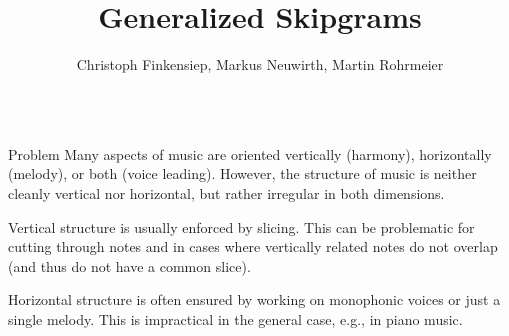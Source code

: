 \documentclass[final]{beamer}
\title{Generalized Skipgrams}
\author{Christoph Finkensiep, Markus Neuwirth, Martin Rohrmeier}
\institute{Digital and Cognitive Musicology Lab, École Polytechnique Fédérale de Lausanne}
\newcommand*{\pianoroll}{
  \draw (0,2) rectangle (1,2.4);
  \draw (1,2.4) rectangle (2,2.8);
  \draw (2,2) rectangle (2.5,2.4);
  \draw (2.5,1.6) rectangle (3,2);
  \draw (3,1.2) rectangle (3.5,1.6);
  \draw (3.5,0.8) rectangle (4,1.2);
  
  \draw (4,1.6) rectangle (5,2);
  \draw (5,2) rectangle (6,2.4);
  \draw (6,1.6) rectangle (6.5,2);
  \draw (6.5,1.2) rectangle (7,1.6);
  \draw (7,0.8) rectangle (7.5,1.2);
  \draw (7.5,0.4) rectangle (8,0.8);
  
  \draw (1,-0.4) rectangle (2,0);
  \draw (2,0) rectangle (4,0.4);
  \draw (5,-0.8) rectangle (6,-0.4);
  \draw (6,-0.4) rectangle (8,0);
}
\begin{document}
\begin{frame}[t]

  \begin{columns}[t]
    \begin{column}{0.3\textwidth}
      \begin{block}{Problem}
        Many aspects of music are oriented \alert{vertically}
        (harmony), \alert{horizontally} (melody), or both (voice
        leading).  However, the structure of music is neither cleanly
        vertical nor horizontal, but rather irregular in both
        dimensions.

        \begin{adjustbox}{scale=2.7,center,margin=0 1ex}
        \end{adjustbox}

        Vertical structure is usually enforced by \alert{slicing}.
        This can be problematic for cutting through notes and in cases
        where vertically related notes do not overlap (and thus do not
        have a common slice).

        \begin{adjustbox}{scale=2.7,center,margin=0 1ex}
        \end{adjustbox}

        Horizontal structure is often ensured by working on
        \alert{monophonic voices} or just a single \alert{melody}.
        This is impractical in the general case, e.g., in piano music.
        
        \begin{adjustbox}{scale=2.7,center,margin=0 1ex}
        \end{adjustbox}
        

\end{block}
\end{column}
\end{columns}
\end{frame}
\end{document}
